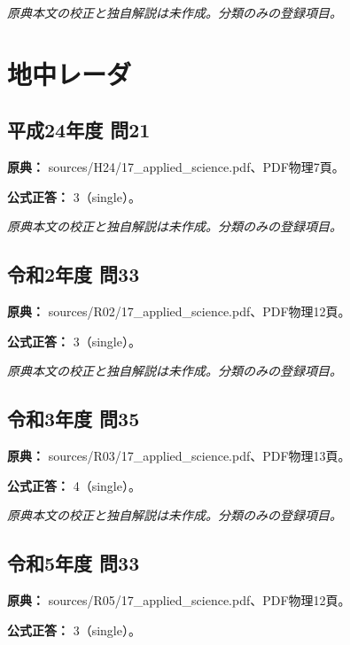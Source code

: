 \par\textit{原典本文の校正と独自解説は未作成。分類のみの登録項目。}

\section{地中レーダ}

\subsection{平成24年度 問21}
\label{q:h24-reg-applied-21}

\noindent\textbf{原典：} sources/H24/17\_applied\_science.pdf、PDF物理7頁。

\textbf{公式正答：} 3（single）。

\par\textit{原典本文の校正と独自解説は未作成。分類のみの登録項目。}

\subsection{令和2年度 問33}
\label{q:r02-reg-applied-33}

\noindent\textbf{原典：} sources/R02/17\_applied\_science.pdf、PDF物理12頁。

\textbf{公式正答：} 3（single）。

\par\textit{原典本文の校正と独自解説は未作成。分類のみの登録項目。}

\subsection{令和3年度 問35}
\label{q:r03-reg-applied-35}

\noindent\textbf{原典：} sources/R03/17\_applied\_science.pdf、PDF物理13頁。

\textbf{公式正答：} 4（single）。

\par\textit{原典本文の校正と独自解説は未作成。分類のみの登録項目。}

\subsection{令和5年度 問33}
\label{q:r05-reg-applied-33}

\noindent\textbf{原典：} sources/R05/17\_applied\_science.pdf、PDF物理12頁。

\textbf{公式正答：} 3（single）。

